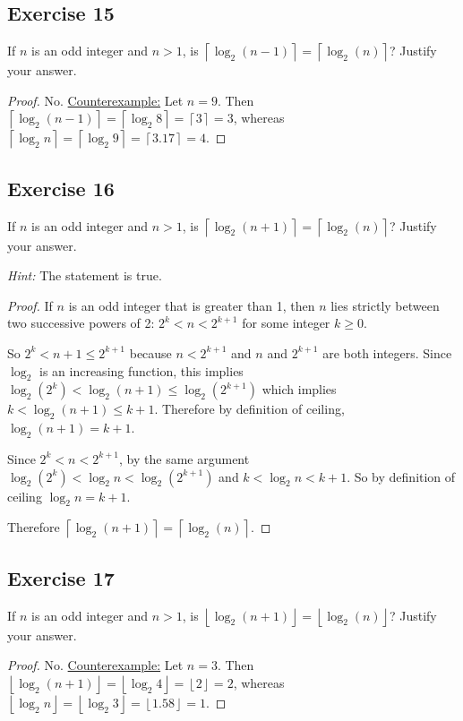 \documentclass[14pt]{extarticle}
\newcommand{\floor}[1]{{\left\lfloor#1\right\rfloor}}
\newcommand{\ceil}[1]{{\left\lceil#1\right\rceil}}
\begin{document}
\subsection{Exercise 15}
If \(n\) is an odd integer and \(n > 1\), is \(\ceil{\log_2(n - 1)} = \ceil{\log_2(n)}\)? Justify your answer.

\begin{proof}
No. \underline{Counterexample:} Let \(n = 9\). Then \(\ceil{\log_2 (n - 1)} =  \ceil{\log_2 8} = \ceil{3} = 3\), 
whereas \(\ceil{\log_2 n} = \ceil{\log_2 9} = \ceil{3.17} = 4\).
\end{proof}

\subsection{Exercise 16}
If \(n\) is an odd integer and \(n > 1\), is \(\ceil{\log_2(n + 1)} = \ceil{\log_2(n)}\)? Justify your answer.

{\it Hint:} The statement is true.

\begin{proof}
If \(n\) is an odd integer that is greater than 1, then \(n\) lies strictly between two successive powers of 2: \(2^k < n < 
2^{k+1}\) for some integer \(k \geq 0\). 

So \(2^k < n+1 \leq 2^{k+1}\) because \(n < 2^{k+1}\) and \(n\) and \(2^{k+1}\) are both integers. Since \(\log_2\) is an 
increasing function, this implies \(\log_2(2^k) < \log_2(n+1) \leq \log_2(2^{k+1})\) which implies \(k < \log_2(n+1) \leq k + 1\). Therefore by definition of ceiling, \(\log_2(n+1) = 
k+1\).

Since \(2^k < n < 2^{k+1}\), by the same argument \(\log_2(2^k) < \log_2 n < \log_2(2^{k+1})\) and \(k < \log_2 n 
< k+1\). So by definition of ceiling \(\log_2 n = k+1\).

Therefore \(\ceil{\log_2(n + 1)} = \ceil{\log_2(n)}\).
\end{proof}

\subsection{Exercise 17}
If \(n\) is an odd integer and \(n > 1\), is \(\floor{\log_2(n + 1)} = \floor{\log_2(n)}\)? Justify your answer.

\begin{proof}
No. \underline{Counterexample:} Let \(n = 3\). Then \(\floor{\log_2 (n + 1)} =  \floor{\log_2 4} = \floor{2} = 2\), 
whereas \(\floor{\log_2 n} = \floor{\log_2 3} = \floor{1.58} = 1\).
\end{proof}
\end{document}
